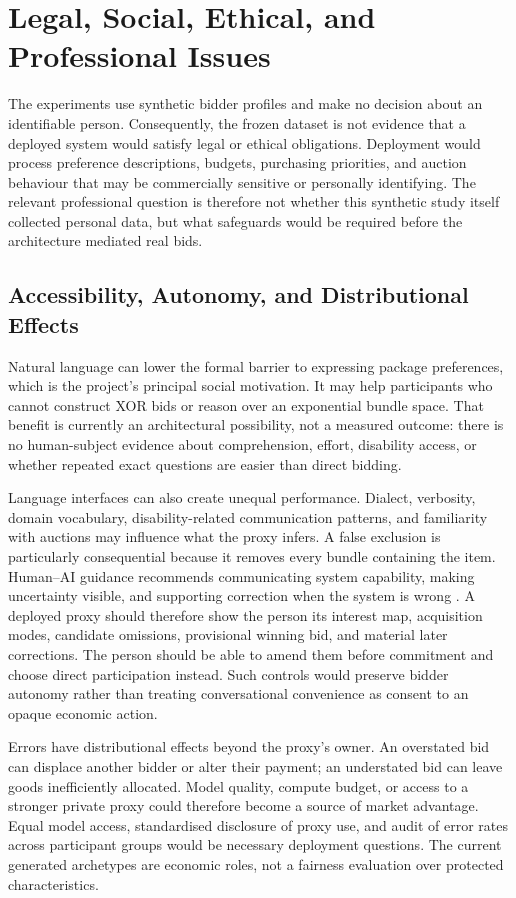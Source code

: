 \section{Legal, Social, Ethical, and Professional Issues}
\label{sec:professional-issues}

The experiments use synthetic bidder profiles and make no decision about an
identifiable person. Consequently, the frozen dataset is not evidence that a
deployed system would satisfy legal or ethical obligations. Deployment would
process preference descriptions, budgets, purchasing priorities, and auction
behaviour that may be commercially sensitive or personally identifying. The
relevant professional question is therefore not whether this synthetic study
itself collected personal data, but what safeguards would be required before
the architecture mediated real bids.

\subsection{Accessibility, Autonomy, and Distributional Effects}

Natural language can lower the formal barrier to expressing package
preferences, which is the project's principal social motivation. It may help
participants who cannot construct XOR bids or reason over an exponential
bundle space. That benefit is currently an architectural possibility, not a
measured outcome: there is no human-subject evidence about comprehension,
effort, disability access, or whether repeated exact questions are easier than
direct bidding.

Language interfaces can also create unequal performance. Dialect, verbosity,
domain vocabulary, disability-related communication patterns, and familiarity
with auctions may influence what the proxy infers. A false exclusion is
particularly consequential because it removes every bundle containing the
item. Human--AI guidance recommends communicating system capability, making
uncertainty visible, and supporting correction when the system is wrong
\citep{amershi2019guidelines}. A deployed proxy should therefore show the
person its interest map, acquisition modes, candidate omissions, provisional
winning bid, and material later corrections. The person should be able to
amend them before commitment and choose direct participation instead. Such
controls would preserve bidder autonomy rather than treating conversational
convenience as consent to an opaque economic action.

Errors have distributional effects beyond the proxy's owner. An overstated
bid can displace another bidder or alter their payment; an understated bid can
leave goods inefficiently allocated. Model quality, compute budget, or access
to a stronger private proxy could therefore become a source of market
advantage. Equal model access, standardised disclosure of proxy use, and audit
of error rates across participant groups would be necessary deployment
questions. The current generated archetypes are economic roles, not a fairness
evaluation over protected characteristics.

